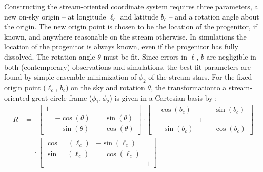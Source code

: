 \documentclass[fleqn,usenatbib]{mnras}
\begin{document}
    Constructing the stream-oriented coordinate system requires three
    parameters, a new on-sky origin -- at longitude $\ell_c$ and latitude $b_c$
    -- and a rotation angle about the origin. The new origin point is chosen to
    be the location of the progenitor, if known, and anywhere reasonable on the
    stream otherwise. In simulations the location of the progenitor is always
    known, even if the progenitor has fully dissolved. The rotation angle
    $\theta$ must be fit. Since errors in $\ell$, $b$ are negligible in both
    (contemporary) observations and simulations, the best-fit parameters are
    found by simple ensemble minimization of $\phi_2$ of the stream stars. For
    the fixed origin point ($\ell_c$, $b_c$) on the sky and rotation $\theta$,
    the transformation\footnotemark to a stream-oriented great-circle frame
    ($\phi_1, \phi_2$) is given in a Cartesian basis by \citep{Bovy2011}:
    \begingroup\makeatletter\def\f@size{10}\check@mathfonts
    \def\maketag@@@#1{\hbox{\m@th\large\normalfont#1}}%
    \setlength\arraycolsep{2pt}
    \begin{align}
      R &= \phantom{\cdot} \left[\begin{matrix}
        1 &   &   \\
          & - \cos{\left(\theta \right)} & \phantom{+} \sin{\left(\theta \right)} \\
          & - \sin{\left(\theta \right)} & \phantom{+} \cos{\left(\theta \right)}
      \end{matrix}\right]
      \cdot
      \left[\begin{matrix}
          - \cos{\left(b_c \right)} &   & - \sin{\left(b_c \right)} \\
            & 1 &   \\
          \phantom{+} \sin{\left(b_c \right)} &   & - \cos{\left(b_c \right)}
      \end{matrix}\right]
      \\
      &\phantom{=} \cdot
      \left[\begin{matrix}
        \cos{\phantom{+} \left(\ell_c \right)} & - \sin{\left(\ell_c \right)} &   \\
        \sin{\phantom{+} \left(\ell_c \right)} & \phantom{+} \cos{\left(\ell_c \right)} &   \\
          &   & 1
      \end{matrix}\right] \nonumber
    \end{align}
    \endgroup
\end{document}
